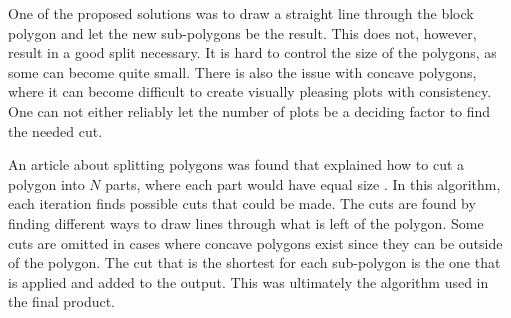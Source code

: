 One of the proposed solutions was to draw a straight line through the block polygon and let the new sub-polygons be the result. 
This does not, however, result in a good split necessary. 
It is hard to control the size of the polygons, as some can become quite small. 
There is also the issue with concave polygons, where it can become difficult to create visually pleasing plots with consistency. 
One can not either reliably let the number of plots be a deciding factor to find the needed cut. 

An article about splitting polygons was found that explained how to cut a polygon into $N$ parts, where each part would have equal size \cite{polygon_splitting_article}. 
In this algorithm, each iteration finds possible cuts that could be made. 
The cuts are found by finding different ways to draw lines through what is left of the polygon. 
Some cuts are omitted in cases where concave polygons exist since they can be outside of the polygon. 
The cut that is the shortest for each sub-polygon is the one that is applied and added to the output. 
This was ultimately the algorithm used in the final product. 
